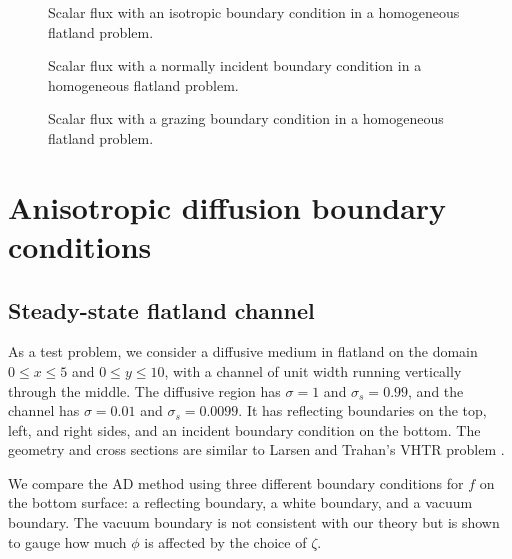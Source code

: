\begin{figure}[htb!]
  \centering\small
  \hspace{-.5in}
  
  \hspace{-.5in}
  \caption{Scalar flux with an isotropic boundary condition in a homogeneous
  flatland problem.}
  \label{fig:isotropic}
\end{figure}

\begin{figure}[htb!]
  \centering\small
  \hspace{-.5in}
  
  \hspace{-.5in}
  \caption{Scalar flux with a normally incident boundary condition in a
  homogeneous flatland problem.}
  \label{fig:delta}
\end{figure}

\begin{figure}[htb!]
  \centering\small
  \hspace{-.5in}
  
  \hspace{-.5in}
  \caption{Scalar flux with a grazing boundary condition in a homogeneous
  flatland problem.}
  \label{fig:grazing}
\end{figure}

\section{Anisotropic diffusion boundary conditions}

\subsection{Steady-state flatland channel}
As a test problem, we consider a diffusive medium in flatland on
the domain $0
\le x \le 5$ and $0 \le y \le 10$, with a channel of unit width running
vertically through the middle. The diffusive region has $\sigma=1$ and
$\sigma_s=0.99$, and the channel has $\sigma=0.01$ and $\sigma_s=0.0099$. It has
reflecting boundaries on the top, left, and right sides, and an incident
boundary condition on the bottom. The geometry and cross sections are similar to Larsen
and Trahan's VHTR problem \cite{Lar2009c}.

We compare the AD method using three different boundary conditions for $f$ on
the bottom surface: a reflecting boundary, a white boundary, and a vacuum
boundary. The vacuum boundary is not consistent with our theory but
is shown to gauge how much $\phi$ is affected by the choice of $\zeta$.

